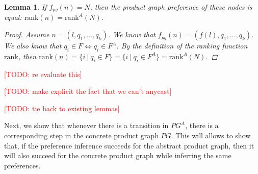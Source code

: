 \documentclass[twocolumn, openany]{sig-alternate-10pt}
\newcommand{\todo}[1]{\textcolor{red}{[TODO: #1]}}
\newcommand{\Rank}{\ensuremath{\mathrm{rank}}}
\newtheorem{lem}[thm]{Lemma}
\begin{document}
\begin{lem}
  If $f_{pg}(n) = N$, then the product graph preference of these nodes is equal: $\Rank(n) = \Rank^A(N)$.

  \begin{proof}
    Assume $n = (l,q_1,\dots,q_k)$. We know that $f_{pg}(n) = (f(l),q_1,\dots,q_k)$. 
    We also know that $q_i \in F \iff q_i \in F^A$. 
    By the definition of the ranking function $\Rank$, then 
    $\Rank(n) = \{ i ~\vert~ q_i \in F \} = \{ i ~\vert~ q_i \in F^A \} = \Rank^A(N)$.
  \end{proof}

\end{lem}




\todo{re evaluate this}

\todo{make explicit the fact that we can't anycast}

\todo{tie back to existing lemmas}

\vspace{1em}

Next, we show that whenever there is a transition in $PG^A$, there is a corresponding step in the concrete product graph $PG$. This will allows to show that, if the preference inference succeeds for the abstract product graph, then it will also succeed for the concrete product graph while inferring the same preferences.

\vspace{1em}
\end{document}
